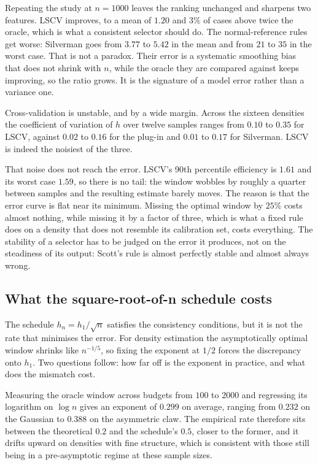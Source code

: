 \documentclass[11pt]{article}
\begin{document}
Repeating the study at $n = 1000$ leaves the ranking unchanged and sharpens two features.
LSCV improves, to a mean of $1.20$ and $3\%$ of cases above twice the oracle, which is what a
consistent selector should do. The normal-reference rules get worse: Silverman goes from
$3.77$ to $5.42$ in the mean and from $21$ to $35$ in the worst case. That is not a paradox.
Their error is a systematic smoothing bias that does not shrink with $n$, while the oracle
they are compared against keeps improving, so the ratio grows. It is the signature of a
model error rather than a variance one.

Cross-validation is unstable, and by a wide margin. Across the sixteen densities the
coefficient of variation of $h$ over twelve samples ranges from $0.10$ to $0.35$ for
LSCV, against $0.02$ to $0.16$ for the plug-in and $0.01$ to $0.17$ for Silverman. LSCV is
indeed the noisiest of the three.

That noise does not reach the error. LSCV's 90th percentile efficiency is $1.61$ and its
worst case $1.59$, so there is no tail: the window wobbles by roughly a quarter between
samples and the resulting estimate barely moves. The reason is that the error curve is flat
near its minimum. Missing the optimal window by $25\%$ costs almost nothing, while missing it
by a factor of three, which is what a fixed rule does on a density that does not resemble its
calibration set, costs everything. The stability of a selector has to be judged on the error
it produces, not on the steadiness of its output: Scott's rule is almost perfectly stable and
almost always wrong.

\subsection{What the square-root-of-n schedule costs}
\label{sec:schedule-cost}

The schedule $h_n = h_1/\sqrt n$ satisfies the consistency conditions, but it is not the rate
that minimises the error. For density estimation the asymptotically optimal window shrinks
like $n^{-1/5}$, so fixing the exponent at $1/2$ forces the discrepancy onto $h_1$. Two
questions follow: how far off is the exponent in practice, and what does the mismatch cost.

Measuring the oracle window across budgets from $100$ to $2000$ and regressing its logarithm
on $\log n$ gives an exponent of $0.299$ on average, ranging from $0.232$ on the Gaussian to
$0.388$ on the asymmetric claw. The empirical rate therefore sits between the theoretical
$0.2$ and the schedule's $0.5$, closer to the former, and it drifts upward on densities with
fine structure, which is consistent with those still being in a pre-asymptotic regime at
these sample sizes.
\end{document}
